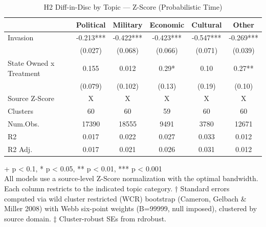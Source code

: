 \begin{table}[t]
\caption{\label{tab:table-03}H2 Diff-in-Disc by Topic — Z-Score (Probabilistic Time)}
\fontsize{12.0pt}{14.0pt}\selectfont
\begin{tabular*}{\linewidth}{@{\extracolsep{\fill}}lccccc}
\toprule
  & Political & Military & Economic & Cultural & Other \\ 
\midrule\addlinespace[2.5pt]
Invasion & -0.213*** & -0.422*** & -0.423*** & -0.547*** & -0.269*** \\ 
 & (0.027) & (0.068) & (0.066) & (0.071) & (0.039) \\ 
State Owned x Treatment & 0.155 & 0.012 & 0.29* & 0.10 & 0.27** \\ 
{} & {(0.079)} & {(0.102)} & {(0.13)} & {(0.19)} & {(0.10)} \\ 
Source Z-Score & X & X & X & X & X \\ 
Clusters & 60 & 60 & 59 & 60 & 60 \\ 
Num.Obs. & 17390 & 18555 & 9491 & 3780 & 12671 \\ 
R2 & 0.017 & 0.022 & 0.027 & 0.033 & 0.012 \\ 
R2 Adj. & 0.017 & 0.021 & 0.026 & 0.031 & 0.012 \\ 
\bottomrule
\end{tabular*}
\begin{minipage}{\linewidth}
\vspace{.05em}
+ p < 0.1, * p < 0.05, ** p < 0.01, *** p < 0.001\\
All models use a source-level Z-Score normalization with the optimal bandwidth.
Each column restricts to the indicated topic category. † Standard errors
computed via wild cluster restricted (WCR) bootstrap (Cameron, Gelbach \& Miller
2008) with Webb six-point weights (B=99999, null imposed), clustered by source
domain. ‡ Cluster-robust SEs from rdrobust.\\
\end{minipage}
\end{table}

